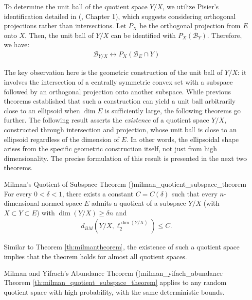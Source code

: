 To determine the unit ball of the quotient space $Y/X$, we utilize Pisier's identification detailed in (\cite{pisierVolumeConvexBodies1989}, Chapter 1), which suggests considering orthogonal projections rather than intersections.  Let $P_X$ be the orthogonal projection from $E$ onto $X$. Then, the unit ball of $Y/X$ can be identified with $P_X(\mathcal{B}_Y)$. Therefore, we have:
\begin{align*}
\mathcal{B}_{Y/X} \longleftrightarrow P_X(\mathcal{B}_E \cap Y)
\end{align*}

The key observation here is the geometric construction of the unit ball of $Y/X$: it involves the intersection of a centrally symmetric convex set with a subspace followed by an orthogonal projection onto another subspace. While previous theorems established that such a construction can yield a unit ball arbitrarily close to an ellipsoid when $\dim E$ is sufficiently large, the following theorems go further. The following result asserts the \emph{existence} of a quotient space $Y/X$, constructed through intersection and projection, whose unit ball is close to an ellipsoid regardless of the dimension of $E$. In other words, the ellipsoidal shape arises from the specific geometric construction itself, not just from high dimensionality.  The precise formulation of this result is presented in the next two theorems.
\begin{theorembox}{Milman's Quotient of Subspace Theorem (\cite{artstein-avidanAsymptoticGeometricAnalysis2015})}{milman_quotient_subspace_theorem}
    For every $0<\delta<1$, there exists a constant $C = C(\delta)$ such that every $n$-dimensional normed space $E$ admits a quotient of a subspace $Y/X$ (with $X\subset Y\subset E$) with $\dim(Y/X) \geq \delta n$ and 
        \begin{align*}
        d_{BM}(Y/X, \ell_2^{\dim(Y/X)}) \leq C.
        \end{align*}
\end{theorembox}

Similar to Theorem \ref{th:milmantheorem}, the existence of such a quotient space implies that the theorem holds for almost all quotient spaces.
\begin{theorembox}{Milman and Yifrach's Abundance Theorem (\cite{milmanRegularRandomSections2021})}{milman_yifach_abundance}
    Theorem \ref{th:milman_quotient_subspace_theorem} applies to any random quotient space with high probability, with the same deterministic bounds.
\end{theorembox}

